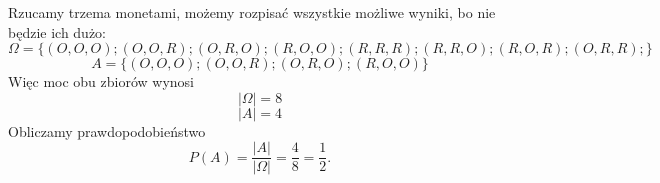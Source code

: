 \medskip
{} 
\medskip

Rzucamy trzema monetami, możemy rozpisać wszystkie możliwe wyniki, bo nie będzie ich dużo:
$$
\Omega=\{ (O,O,O); (O,O,R); (O,R,O); (R,O,O); (R,R,R); (R,R,O); (R,O,R); (O,R,R);\}
$$
$$
A=\{ (O,O,O); (O,O,R); (O,R,O); (R,O,O)\}
$$
Więc moc obu zbiorów wynosi
$$
|\Omega|=8
$$
$$
|A|=4
$$
Obliczamy prawdopodobieństwo 
$$
P(A)=\frac{|A|}{|\Omega|}=\frac{4}{8}=\frac{1}{2}.
$$